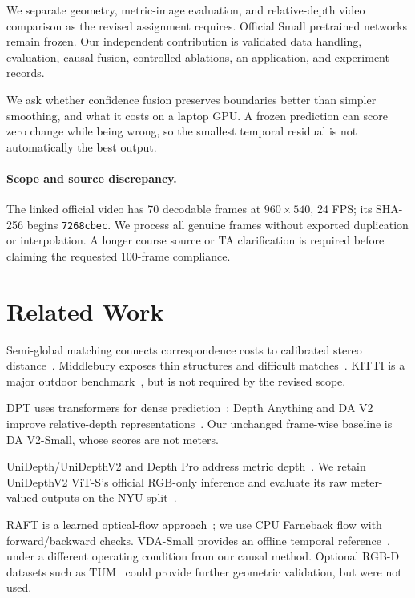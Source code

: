 \documentclass[10pt,twocolumn,letterpaper]{article}
\begin{document}
We separate geometry, metric-image evaluation, and relative-depth video comparison as the revised assignment requires. Official Small pretrained networks remain frozen. Our independent contribution is validated data handling, evaluation, causal fusion, controlled ablations, an application, and experiment records.

We ask whether confidence fusion preserves boundaries better than simpler smoothing, and what it costs on a laptop GPU. A frozen prediction can score zero change while being wrong, so the smallest temporal residual is not automatically the best output.

\paragraph{Scope and source discrepancy.}
The linked official video has 70 decodable frames at $960\times540$, 24 FPS; its SHA-256 begins \texttt{7268cbec}. We process all genuine frames without exported duplication or interpolation. A longer course source or TA clarification is required before claiming the requested 100-frame compliance.

\section{Related Work}
Semi-global matching connects correspondence costs to calibrated stereo distance~\cite{hirschmuller2008}. Middlebury exposes thin structures and difficult matches~\cite{scharstein2014}. KITTI is a major outdoor benchmark~\cite{geiger2012}, but is not required by the revised scope.

DPT uses transformers for dense prediction~\cite{ranftl2021}; Depth Anything and DA V2 improve relative-depth representations~\cite{yang2024da,yang2024dav2}. Our unchanged frame-wise baseline is DA V2-Small, whose scores are not meters.

UniDepth/UniDepthV2 and Depth Pro address metric depth~\cite{piccinelli2024,piccinelli2025,bochkovskii2025}. We retain UniDepthV2 ViT-S's official RGB-only inference and evaluate its raw meter-valued outputs on the NYU split~\cite{silberman2012}.

RAFT is a learned optical-flow approach~\cite{teed2020}; we use CPU Farneback flow with forward/backward checks. VDA-Small provides an offline temporal reference~\cite{chen2025}, under a different operating condition from our causal method. Optional RGB-D datasets such as TUM~\cite{sturm2012} could provide further geometric validation, but were not used.
\end{document}
